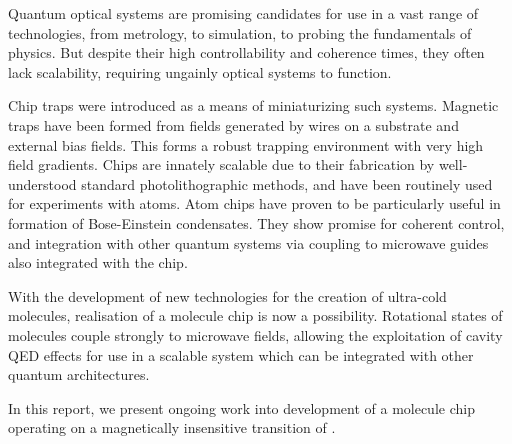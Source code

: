 Quantum optical systems are promising candidates for use in a vast range of
technologies, from metrology, to simulation, to probing the fundamentals of
physics. But despite their high controllability and coherence times, they often
lack scalability, requiring ungainly optical systems to function.

Chip traps were introduced as a means of miniaturizing such systems. Magnetic
traps have been formed from fields generated by wires on a substrate and
external bias fields. This forms a robust trapping environment with very high
field gradients. Chips are innately scalable due to their fabrication by
well-understood standard photolithographic methods, and have been routinely
used for experiments with atoms. Atom chips have proven to be particularly
useful in formation of Bose-Einstein condensates. They show promise for
coherent control, and integration with other quantum systems via coupling to
microwave guides also integrated with the chip.

With the development of new technologies for the creation of ultra-cold
molecules, realisation of a molecule chip is now a possibility. Rotational
states of molecules couple strongly to microwave fields, allowing the
exploitation of cavity QED effects for use in a scalable system which can be
integrated with other quantum architectures.

In this report, we present ongoing work into development of a molecule chip
operating on a magnetically insensitive transition of \CaF{}.
